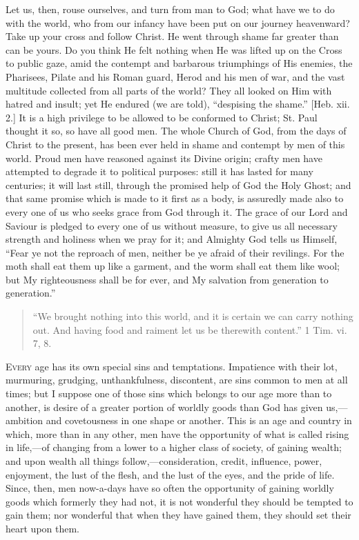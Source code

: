 Let us, then, rouse ourselves, and turn from man to God; what have
we to do with the world, who from our infancy have been put on our
journey heavenward? Take up your cross and follow Christ. He went
through shame far greater than can be yours. Do you think He felt
nothing when He was lifted up on the Cross to public gaze, amid the
contempt and barbarous triumphings of His enemies, the Pharisees,
Pilate and his Roman guard, Herod and his men of war, and the vast
multitude collected from all parts of the world? They all looked on
Him with hatred and insult; yet He endured (we are told),
``despising the shame.'' [Heb. xii. 2.] It is a high privilege
to be allowed to be conformed to Christ; St. Paul thought it so, so
have all good men. The whole Church of God, from the days of Christ to
the present, has been ever held in shame and contempt by men of this
world. Proud men have reasoned against its Divine origin; crafty men
have attempted to degrade it to political purposes: still it has
lasted for many centuries; it will last still, through the promised
help of God the Holy Ghost; and that same promise which is made to it
first as a body, is assuredly made also to every one of us who seeks
grace from God through it. The grace of our Lord and Saviour is
pledged to every one of us without measure, to give us all necessary
strength and holiness when we pray for it; and Almighty God tells us
Himself, ``Fear ye not the reproach of men, neither be ye afraid
of their revilings. For the moth shall eat them up like a garment, and
the worm shall eat them like wool; but My righteousness shall be for
ever, and My salvation from generation to generation.''


\begin{quote}

``We brought nothing into this world, and it is certain we can
carry nothing out. And having food and raiment let us be therewith
content.'' 1 Tim. vi. 7, 8.

\end{quote}

E\textsc{very} age has its own special sins and temptations. Impatience with
their lot, murmuring, grudging, unthankfulness, discontent, are sins
common to men at all times; but I suppose one of those sins which
belongs to our age more than to another, is desire of a greater
portion of worldly goods than God has given us,—ambition and
covetousness in one shape or another. This is an age and country in
which, more than in any other, men have the opportunity of what is
called rising in life,—of changing from a lower to a higher class of
society, of gaining wealth; and upon wealth all things follow,—consideration,
credit, influence, power, enjoyment, the lust of the flesh, and the
lust of the eyes, and the pride of life. Since, then, men now-a-days
have so often the opportunity of gaining worldly goods which formerly
they had not, it is not wonderful they should be tempted to gain them;
nor wonderful that when they have gained them, they should set their
heart upon them.

